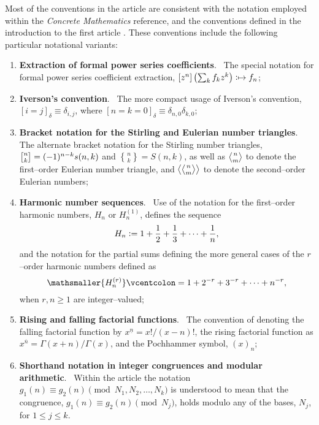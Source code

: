 \documentclass[12pt,reqno]{article}
\numberwithin{sfootnote}{section}
\numberwithin{equation}{section}
\renewcommand{\labelenumi}{\textbf{\arabic{enumi}.}}
\renewcommand{\labelenumi}{$\mathsmaller{\blacktriangleright}$ }
\theoremstyle{DefaultTheoremStyle}
\theoremstyle{definition}
\newcommand{\defequals}{\ensuremath{\vcentcolon=}}
\newcommand{\defmapsto}{\ensuremath{\vcentcolon\mapsto}}
\newcommand{\gkpSI}[2]{\ensuremath{\genfrac{\lbrack}{\rbrack}{0pt}{}{#1}{#2}}}
\newcommand{\gkpSII}[2]{\ensuremath{\genfrac{\{}{\}}{0pt}{}{#1}{#2}}}
\newcommand{\gkpEI}[2]{\ensuremath{\genfrac{\langle}{\rangle}{0pt}{}{#1}{#2}}}
\newcommand{\gkpEII}[2]{\ensuremath{\left\langle\genfrac{\langle}{\rangle}{
            0pt}{}{#1}{#2}\right\rangle}}
\newcommand{\FFactII}[2]{\ensuremath{#1^{\underline{#2}}}}
\newcommand{\RFactII}[2]{\ensuremath{#1^{\overline{#2}}}}
\newcommand{\Pochhammer}[2]{\ensuremath{\left(#1\right)_{#2}}}
\newcommand{\Iverson}[1]{\ensuremath{\left[#1\right]_{\delta}}}
\begin{document}
Most of the conventions in the article are consistent with the 
notation employed within the \emph{Concrete Mathematics} reference, and 
the conventions defined in the introduction to the first article 
\citep{MULTIFACTJIS}. 
These conventions 
include the following particular notational variants: 
\begin{enumerate} 
     \renewcommand{\labelenumi}{$\mathsmaller{\blacktriangleright}$ } 
     \setlength{\itemsep}{-1mm} 
     \newcommand{\localitemlabel}[1]{\textbf{#1}.\ } 

\item \localitemlabel{Extraction of formal power series coefficients} 
The special notation for formal 
power series coefficient extraction, 
$[z^n] \left( \sum_{k} f_k z^k \right) \defmapsto f_n$; 

\item \localitemlabel{Iverson's convention} 
The more compact usage of Iverson's convention, 
$\Iverson{i = j} \equiv \delta_{i,j}$, where 
$\Iverson{n = k = 0} \equiv \delta_{n,0} \delta_{k,0}$; 

\item \localitemlabel{Bracket notation for the Stirling and 
                      Eulerian number triangles} 
The alternate bracket notation for the Stirling number triangles, 
$\gkpSI{n}{k} = (-1)^{n-k} s(n, k)$ and 
$\gkpSII{n}{k} = S(n, k)$, as well as 
$\gkpEI{n}{m}$ to denote the first--order Eulerian number triangle, and 
$\gkpEII{n}{m}$ to denote the second--order Eulerian numbers; 

\item \localitemlabel{Harmonic number sequences} 
Use of the notation for the first--order harmonic numbers, $H_n$ or 
$H_n^{(1)}$, defines the sequence 
\[
H_n \defequals 1+\frac{1}{2}+\frac{1}{3}+\cdots+\frac{1}{n}, 
\] 
and the notation for the partial sums defining the more general cases of the 
$r$--order harmonic numbers defined as 
\[ 
\mathsmaller{H_n^{(r)}} \defequals 1 + 2^{-r} + 3^{-r} + \cdots + n^{-r}, 
\]
when $r, n \geq 1$ are integer--valued; 

\item \localitemlabel{Rising and falling factorial functions} 
The convention of denoting the 
falling factorial function by $\FFactII{x}{n} = x! / (x-n)!$, the 
rising factorial function as $\RFactII{x}{n} = \Gamma(x+n) / \Gamma(x)$, 
and the Pochhammer symbol, $\Pochhammer{x}{n}$; 

\item \localitemlabel{Shorthand notation in integer congruences and modular arithmetic} 
Within the article the notation 
$g_1(n) \equiv g_2(n) \pmod{N_1, N_2, \ldots, N_k}$ is understood to 
mean that the congruence, $g_1(n) \equiv g_2(n) \pmod{N_j}$, holds 
modulo any of the bases, $N_j$, for $1 \leq j \leq k$. 

\end{enumerate} 
\end{document}
